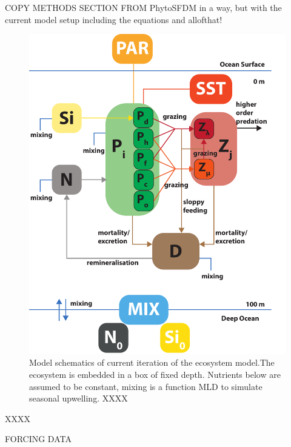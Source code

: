 COPY METHODS SECTION FROM PhytoSFDM in a way, but with the current model setup
including the equations and allofthat!


\begin{figure}
\centering
\includegraphics[trim = 0mm 0mm 0mm 0mm, clip, width=1.\linewidth]{./Chp2-Pre/ModelSchematicsAsset1111.pdf}
\caption[Scheme]{\small {Model schematics of current iteration of the ecosystem model.The ecosystem is embedded in a box of fixed depth. Nutrients below are assumed to be constant, mixing is a function MLD to simulate seasonal upwelling. XXXX}}
\label{ModelSchematics}
\end{figure}
XXXX

FORCING DATA

